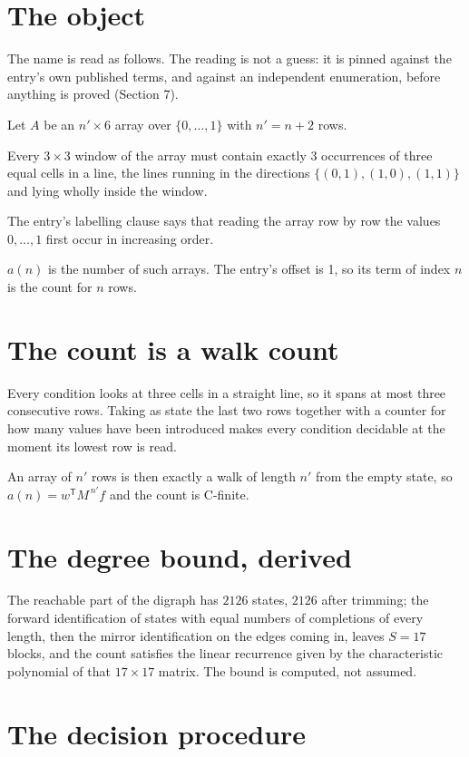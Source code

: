 \documentclass[11pt]{article}
\theoremstyle{definition}
\begin{document}
\section{The object}

The name is read as follows. The reading is not a guess: it is pinned against the entry's own published terms, and against an independent enumeration, before anything is proved (Section 7).

Let $A$ be an $n' \times 6$ array over $\{0,\dots,1\}$ with $n' = n + 2$ rows.

Every $3\times3$ window of the array must contain exactly $3$ occurrences of three equal cells in a line, the lines running in the directions $\{(0,1), (1,0), (1,1)\}$ and lying wholly inside the window.

The entry's labelling clause says that reading the array row by row the values $0,\dots,1$ first occur in increasing order.

$a(n)$ is the number of such arrays. The entry's offset is 1, so its term of index $n$ is the count for $n$ rows.

\section{The count is a walk count}

Every condition looks at three cells in a straight line, so it spans at most three consecutive rows. Taking as state the last two rows together with a counter for how many values have been introduced makes every condition decidable at the moment its lowest row is read.

An array of $n'$ rows is then exactly a walk of length $n'$ from the empty state, so $a(n) = w^{\mathsf T}M^{\,n'}f$ and the count is C-finite.

\section{The degree bound, derived}

The reachable part of the digraph has $2126$ states, $2126$ after trimming; the forward identification of states with equal numbers of completions of every length, then the mirror identification on the edges coming in, leaves $S = 17$ blocks, and the count satisfies the linear recurrence given by the characteristic polynomial of that $17\times17$ matrix. The bound is computed, not assumed.

\section{The decision procedure}
\end{document}
